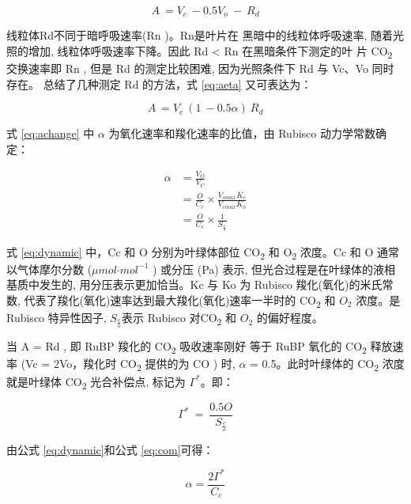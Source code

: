 \documentclass[
]{krantz}
\begin{document}
\begin{equation}
A\ =V_{c}\ -0.5V_{o}\ -\ R_{d}
\label{eq:aeta}
\end{equation}

线粒体Rd不同于暗呼吸速率(Rn )。Rn是叶片在 黑暗中的线粒体呼吸速率, 随着光照的增加, 线粒体呼吸速率下降。因此 Rd \textless{}
Rn 在黑暗条件下测定的叶 片 CO\textsubscript{2} 交换速率即 Rn , 但是 Rd 的测定比较困难, 因为光照条件下 Rd 与
Vc、Vo 同时存在。\citet{Hikosaka2006Temperature} 总结了几种测定
Rd 的方法，式 \eqref{eq:aeta} 又可表达为：

\begin{equation}
A\ =V_{c}\ (1\ -0.5\alpha)\ R_{d}
\label{eq:achange}
\end{equation}

式 \eqref{eq:achange} 中 \(\alpha\) 为氧化速率和羧化速率的比值，由 Rubisco 动力学常数确定：

\begin{equation}
\begin{split}
\alpha & =\frac{V_{O}}{V_{C}}\\
& = \frac{O}{C_c} \times \frac{V_{omax} K_c}{V_{cmax}K_{o}}\\
& = \frac{O}{C_{c}} \times \frac{1}{S_{\frac{c}{o}}}
\end{split}
\label{eq:dynamic}
\end{equation}

式 \eqref{eq:dynamic} 中，Cc 和 O 分别为叶绿体部位 CO\textsubscript{2} 和 O\textsubscript{2} 浓度。Cc 和
O 通常以气体摩尔分数 (\(\mu mol\text{·}mol^{-1}\) ) 或分压 (Pa) 表示, 但光合过程是在叶绿体的液相基质中发生的,
用分压表示更加恰当。Kc 与 Ko 为 Rubisco 羧化(氧化)的米氏常数, 代表了羧化(氧化)速率达到最大羧化(氧化)速率一半时的
CO\textsubscript{2} 和 \(O_{2}\) 浓度。是 Rubisco 特异性因子, \(S_{\frac{c}{o}}\)表示 Rubisco
对CO\textsubscript{2} 和 \(O_{2}\) 的偏好程度。

当 A = Rd , 即 RuBP 羧化的 CO\textsubscript{2} 吸收速率刚好 等于 RuBP 氧化的 CO\textsubscript{2} 释放速率
(Vc = 2Vo，羧化时 CO\textsubscript{2} 提供的为 CO ) 时, \(\alpha\) = 0.5。此时叶绿体的 CO\textsubscript{2} 浓度就是叶绿体 CO\textsubscript{2}
光合补偿点, 标记为 \(\Gamma^{*}\)。即：

\begin{equation}
\Gamma^{*}\ =\ \frac{0.5O}{S_{\frac{c}{o}}}
\label{eq:com}
\end{equation}

由公式 \eqref{eq:dynamic}和公式 \eqref{eq:com}可得：

\begin{equation}
\alpha =\frac{2\Gamma^{*}}{C_{c}}
\label{eq:combine}
\end{equation}
\end{document}

